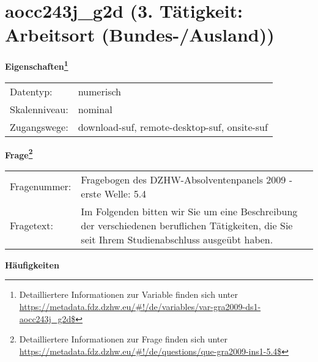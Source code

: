 
    \setcounter{footnote}{0}

    \vspace*{-1.8cm}
	\section{aocc243j\_g2d (3. Tätigkeit: Arbeitsort (Bundes-/Ausland))}
	\label{section:aocc243j_g2d}



    \vspace*{0.5cm}
    \noindent\textbf{Eigenschaften\footnote{Detailliertere Informationen zur Variable finden sich unter
		\url{https://metadata.fdz.dzhw.eu/\#!/de/variables/var-gra2009-ds1-aocc243j_g2d$}}}\\
	\begin{tabularx}{\hsize}{@{}lX}
	Datentyp: & numerisch \\
	Skalenniveau: & nominal \\
	Zugangswege: &
	  download-suf, 
	  remote-desktop-suf, 
	  onsite-suf
 \\
    \end{tabularx}



				\vspace*{0.5cm}
                \noindent\textbf{Frage\footnote{Detailliertere Informationen zur Frage finden sich unter
		              \url{https://metadata.fdz.dzhw.eu/\#!/de/questions/que-gra2009-ins1-5.4$}}}\\
				\begin{tabularx}{\hsize}{@{}lX}
					Fragenummer: &
					  Fragebogen des DZHW-Absolventenpanels 2009 - erste Welle:
					  5.4
 \\
					Fragetext: & Im Folgenden bitten wir Sie um eine Beschreibung der verschiedenen beruflichen Tätigkeiten, die Sie seit Ihrem Studienabschluss ausgeübt haben. \\
				\end{tabularx}





        		\vspace*{0.5cm}
                \noindent\textbf{Häufigkeiten}

